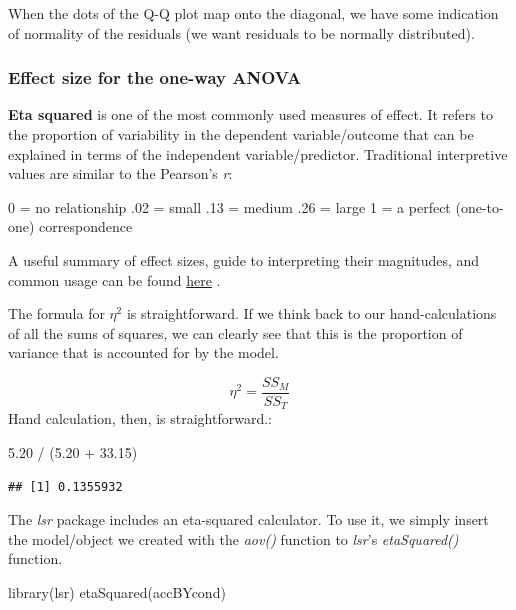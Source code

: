 \documentclass[
  english,
]{book}
\newenvironment{Shaded}{\begin{snugshade}}{\end{snugshade}}
\newcommand{\FloatTok}[1]{\textcolor[rgb]{0.00,0.00,0.81}{#1}}
\newcommand{\FunctionTok}[1]{\textcolor[rgb]{0.00,0.00,0.00}{#1}}
\newcommand{\NormalTok}[1]{#1}
\newcommand{\SpecialCharTok}[1]{\textcolor[rgb]{0.00,0.00,0.00}{#1}}
\begin{document}
When the dots of the Q-Q plot map onto the diagonal, we have some indication of normality of the residuals (we want residuals to be normally distributed).

\hypertarget{effect-size-for-the-one-way-anova}{%
\subsubsection{Effect size for the one-way ANOVA}\label{effect-size-for-the-one-way-anova}}

\textbf{Eta squared} is one of the most commonly used measures of effect. It refers to the proportion of variability in the dependent variable/outcome that can be explained in terms of the independent variable/predictor. Traditional interpretive values are similar to the Pearson's \emph{r}:

0 = no relationship
.02 = small
.13 = medium
.26 = large
1 = a perfect (one-to-one) correspondence

A useful summary of effect sizes, guide to interpreting their magnitudes, and common usage can be found \href{https://imaging.mrc-cbu.cam.ac.uk/statswiki/FAQ/effectSize}{here} \citep{watson_rules_2020}.

The formula for \(\eta^2\) is straightforward. If we think back to our hand-calculations of all the sums of squares, we can clearly see that this is the proportion of variance that is accounted for by the model.

\[\eta ^{2}=\frac{SS_{M}}{SS_{T}}\]
Hand calculation, then, is straightforward.:

\begin{Shaded}
\begin{Highlighting}[]
\FloatTok{5.20} \SpecialCharTok{/}\NormalTok{ (}\FloatTok{5.20} \SpecialCharTok{+} \FloatTok{33.15}\NormalTok{)}
\end{Highlighting}
\end{Shaded}

\begin{verbatim}
## [1] 0.1355932
\end{verbatim}

The \emph{lsr} package includes an eta-squared calculator. To use it, we simply insert the model/object we created with the \emph{aov()} function to \emph{lsr}'s \emph{etaSquared()} function.

\begin{Shaded}
\begin{Highlighting}[]
\FunctionTok{library}\NormalTok{(lsr)}
\FunctionTok{etaSquared}\NormalTok{(accBYcond)}
\end{Highlighting}
\end{Shaded}
\end{document}
